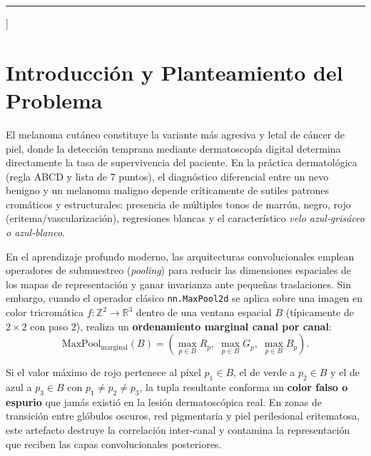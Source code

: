 \documentclass[10pt,a4paper,twocolumn]{article}
\begin{document}
\begin{@twocolumnfalse}
\begin{abstract}
      \vspace{0.2cm}\\
      \textbf{\textit{Palabras Clave---}} Morfología matemática en color, Pooling morfológico adaptativo, Ordenamiento reducido ($\mathcal{R}$-ordering), Colores falsos, Entropía de histograma, Partición de dominio, Detección de melanoma, Redes neuronales convolucionales.
    \end{abstract}
    \vspace{0.4cm}
    \hrule
    \vspace{0.45cm}
  \end{@twocolumnfalse}
]

\section{Introducción y Planteamiento del Problema}

El melanoma cutáneo constituye la variante más agresiva y letal de cáncer de piel, donde la detección temprana mediante dermatoscopía digital determina directamente la tasa de supervivencia del paciente. En la práctica dermatológica (regla ABCD y lista de 7 puntos), el diagnóstico diferencial entre un nevo benigno y un melanoma maligno depende críticamente de sutiles patrones cromáticos y estructurales: presencia de múltiples tonos de marrón, negro, rojo (eritema/vascularización), regresiones blancas y el característico \emph{velo azul-grisáceo o azul-blanco}.

En el aprendizaje profundo moderno, las arquitecturas convolucionales emplean operadores de submuestreo (\emph{pooling}) para reducir las dimensiones espaciales de los mapas de representación y ganar invarianza ante pequeñas traslaciones. Sin embargo, cuando el operador clásico \texttt{nn.MaxPool2d} se aplica sobre una imagen en color tricromática $f: \mathbb{Z}^2 \to \mathbb{R}^3$ dentro de una ventana espacial $B$ (típicamente de $2\times2$ con paso $2$), realiza un \textbf{ordenamiento marginal canal por canal}:
\begin{equation}
  \text{MaxPool}_{\text{marginal}}(B) = \left( \max_{p \in B} R_p, \; \max_{p \in B} G_p, \; \max_{p \in B} B_p \right).
  \label{eq:marginal_maxpool}
\end{equation}

Si el valor máximo de rojo pertenece al píxel $p_1 \in B$, el de verde a $p_2 \in B$ y el de azul a $p_3 \in B$ con $p_1 \neq p_2 \neq p_3$, la tupla resultante conforma un \textbf{color falso o espurio} que jamás existió en la lesión dermatoscópica real. En zonas de transición entre glóbulos oscuros, red pigmentaria y piel perilesional eritematosa, este artefacto destruye la correlación inter-canal y contamina la representación que reciben las capas convolucionales posteriores.
\end{document}
